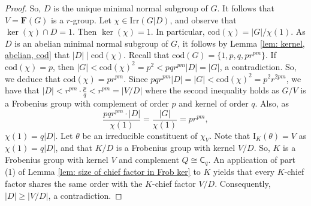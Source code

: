 \documentclass[9pt]{article}
\begin{document}
\begin{proof}
	



    So, $D$ is the unique minimal normal subgroup of $G$.
	It follows that $V=\mathbf{F}(G)$ is a $r$-group.
     Let $\chi\in \mathrm{Irr}(G|D)$, and observe that $\ker(\chi)\cap D=1$.
	Then $\ker(\chi)=1$.
	In particular, $\mathrm{cod}(\chi)=|G|/\chi(1)$.
	As $D$ is an abelian minimal normal subgroup of $G$,
    it follows by Lemma \ref{lem: kernel, abelian, cod} that $|D|\mid \mathrm{cod}(\chi)$.
	Recall that $\mathrm{cod}(G)=\{ 1,p,q,pr^{pm} \}$.
	If $\mathrm{cod}(\chi)=p$, 
	then $|G|<\mathrm{cod}(\chi)^{2}=p^{2}<pqr^{pm}|D|=|G|$, a contradiction.
	So, 
	we deduce that $\mathrm{cod}(\chi)=pr^{pm}$.
    Since $pqr^{pm}|D|=|G|<\mathrm{cod}(\chi)^{2}=p^{2}r^{2pm}$,
	we have that $|D|<r^{pm}\cdot \frac{p}{q}<r^{pm}=|V/D|$ where the second inequality holds as $G/V$ is a Frobenius group with complement of order $p$ and kernel of order $q$.
	Also, as
	$$\frac{pqr^{pm}\cdot |D|}{\chi(1)}=\frac{|G|}{\chi(1)}=pr^{pm},$$
    $\chi(1)=q|D|$.	
	Let $\theta$ be an irreducible constituent of $\chi_V$.
    Note that $\mathrm{I}_{K}(\theta)=V$ as $\chi(1)=q|D|$,
	and that $K/D$ is a Frobenius group with kernel $V/D$.
	So, $K$ is a Frobenius group with kernel $V$ and complement $Q\cong \mathsf{C}_{q}$.
	An application of part (1) of Lemma \ref{lem: size of chief factor in Frob ker} to $K$ yields that 
	every $K$-chief factor shares the same order with the $K$-chief factor $V/D$.
	Consequently, $|D|\geq |V/D|$, a contradiction.






\end{proof}
\end{document}
